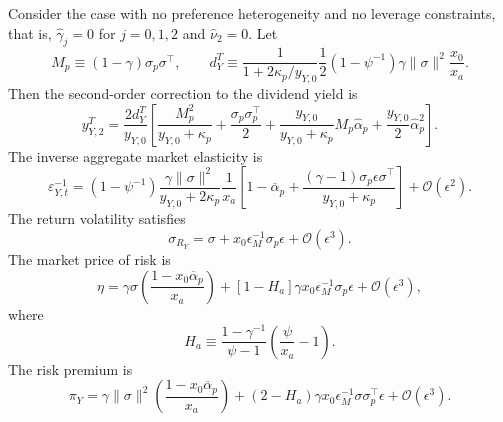 \begin{prop}
    Consider the case with no preference heterogeneity and no leverage constraints, that is, $\hat{\gamma}_j=0$ for $j=0,1,2$ and $\hat{\nu}_2=0$.
    Let
    \begin{equation}
        M_p\equiv (1-\gamma)\sigma_p\sigma^\top,
        \qquad
        d_Y^T
        \equiv
        \frac{1}{1+2\kappa_p/y_{Y,0}}
        \frac{1}{2}(1-\psi^{-1})\gamma\|\sigma\|^2\frac{x_0}{x_a}.
    \end{equation}
    Then the second-order correction to the dividend yield is
    \begin{equation}
        y_{Y,2}^T
        =
        \frac{2d_Y^T}{y_{Y,0}}
        \left[
            \frac{M_p^2}{y_{Y,0}+\kappa_p}
            +\frac{\sigma_p\sigma_p^\top}{2}
            +\frac{y_{Y,0}}{y_{Y,0}+\kappa_p}M_p\hat{\alpha}_p
            +\frac{y_{Y,0}}{2}\hat{\alpha}_p^2
        \right].
    \end{equation}
    The inverse aggregate market elasticity is
    \begin{equation}
        \varepsilon_{Y,t}^{-1}
        =
        \left(1-\psi^{-1}\right)
        \frac{\gamma\|\sigma\|^2}{y_{Y,0}+2\kappa_p}
        \frac{1}{x_a}
        \left[
            1-\overline{\alpha}_p
            +\frac{(\gamma-1)\sigma_p\epsilon\sigma^\top}{y_{Y,0}+\kappa_p}
        \right]
        +\mathcal{O}(\epsilon^2).
    \end{equation}
    The return volatility satisfies
    \begin{equation}
        \sigma_{R_Y}
        =
        \sigma
        +x_0\epsilon_M^{-1}\sigma_p\epsilon
        +\mathcal{O}(\epsilon^3).
    \end{equation}
    The market price of risk is
    \begin{equation}
        \eta
        = \gamma \sigma \left( \frac{1- x_0 \overline{\alpha}_p}{x_a}\right)
        +\left[
            1 -H_{a}
        \right]\gamma x_0\epsilon_M^{-1}\sigma_p\epsilon
        +\mathcal{O}(\epsilon^3),
    \end{equation}
    where
    \begin{equation}
        H_a
        \equiv
        \frac{1-\gamma^{-1}}{\psi-1} \left(\frac{\psi}{x_a} - 1\right).
    \end{equation}
    The risk premium is
    \begin{equation}
        \pi_Y
        =
        \gamma\|\sigma\|^2
        \left(\frac{1-x_0\overline{\alpha}_p}{x_a}\right)
        +(2-H_a)\gamma x_0\epsilon_M^{-1}\sigma\sigma_p^\top\epsilon
        +\mathcal{O}(\epsilon^3).
    \end{equation}
    

\end{prop}
